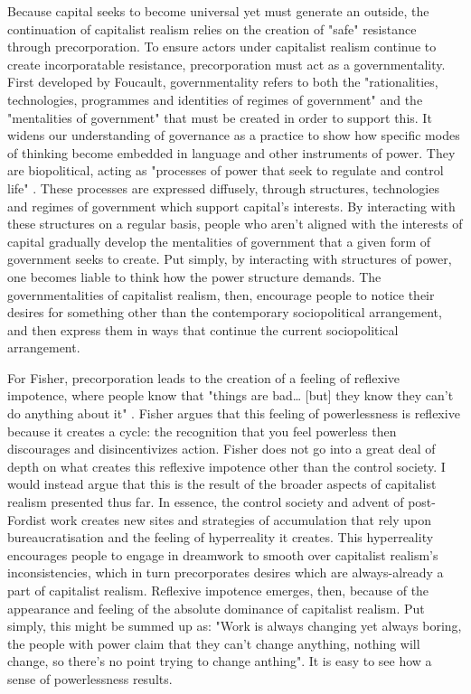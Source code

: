 Because capital seeks to become universal yet must generate an outside, the continuation of capitalist realism relies on the creation of "safe" resistance through precorporation. To ensure actors under capitalist realism continue to create incorporatable resistance, precorporation must act as a governmentality. First developed by Foucault, governmentality refers to both the "rationalities, technologies, programmes and identities of regimes of government" and the "mentalities of government" \citep[24]{dean_governmentality_2010} that must be created in order to support this. It widens our understanding of governance as a practice to show how specific modes of thinking become embedded in language and other instruments of power.  They are biopolitical, acting as "processes of power that seek to regulate and control life" \citep[XX]{lemke_biopolitics:_2011}. These processes are expressed diffusely, through structures, technologies and regimes of government which support capital's interests. By interacting with these structures on a regular basis, people who aren't aligned with the interests of capital gradually develop the mentalities of government that a given form of government seeks to create. Put simply, by interacting with structures of power, one becomes liable to think how the power structure demands. The governmentalities of capitalist realism, then, encourage people to notice their desires for something other than the contemporary sociopolitical arrangement, and then express them in ways that continue the current sociopolitical arrangement. 


For Fisher, precorporation leads to the creation of a feeling of reflexive impotence, where people know that "things are bad\ldots{} [but] they know they can't do anything about it" \citep[24]{fisher_capitalist_2009}. Fisher argues that this feeling of powerlessness is reflexive because it creates a cycle: the recognition that you feel powerless then discourages and disincentivizes action. Fisher does not go into a great deal of depth on what creates this reflexive impotence other than the control society. I would instead argue that this is the result of the broader aspects of capitalist realism presented thus far. In essence, the control society and advent of post-Fordist work creates new sites and strategies of accumulation that rely upon bureaucratisation and the feeling of hyperreality it creates. This hyperreality encourages people to engage in dreamwork to smooth over capitalist realism's inconsistencies, which in turn precorporates desires which are always-already a part of capitalist realism. Reflexive impotence emerges, then, because of the appearance and feeling of the absolute dominance of capitalist realism. Put simply, this might be summed up as: "Work is always changing yet always boring, the people with power claim that they can't change anything, nothing will change, so there's no point trying to change anthing". It is easy to see how a sense of powerlessness results.

